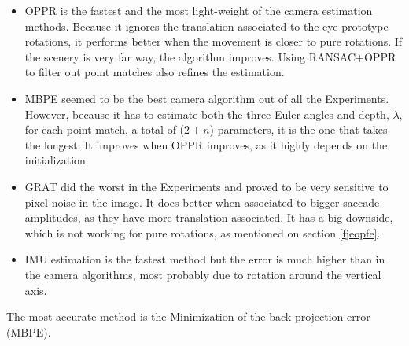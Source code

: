 \begin{itemize}
	\item OPPR is the fastest and the most light-weight of the camera estimation methods. Because it ignores the translation associated to the eye prototype rotations, it performs better when the movement is closer to pure rotations. If the scenery is very far way, the algorithm improves. Using RANSAC+OPPR to filter out point matches also refines the estimation.
	
	\item MBPE seemed to be the best camera algorithm out of all the Experiments. However, because it has to estimate both the three Euler angles and depth, $\lambda$, for each point match, a total of ($2+n$) parameters, it is the one that takes the longest. It improves when OPPR improves, as it highly depends on the initialization.
	
	\item GRAT did the worst in the Experiments and proved to be very sensitive to pixel noise in the image. It does better when associated to bigger saccade amplitudes, as they have more translation associated. It has a big downside, which is not working for pure rotations, as mentioned on section \ref{fjeopfe}.
	
	\item IMU estimation is the fastest method but the error is much higher than in the camera algorithms, most probably due to rotation around the vertical axis.	
	
\end{itemize}

The most accurate method is the Minimization of the back projection error (MBPE). 
